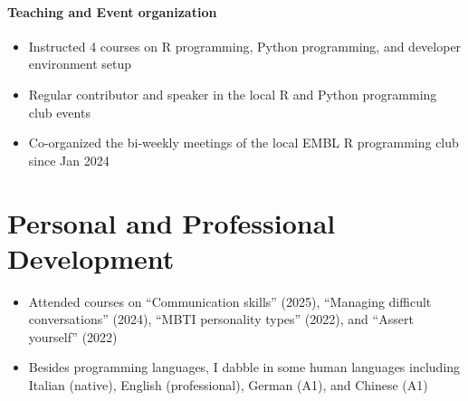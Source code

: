 \documentclass[
	DIV=15,
]{scrartcl}
\begin{document}
\paragraph{Teaching and Event organization}
\begin{itemize}
	\item Instructed 4 courses on R programming, Python programming, and developer environment setup
	\item Regular contributor and speaker in the local R and Python programming club events
	\item Co-organized the bi-weekly meetings of the local EMBL R programming club since Jan 2024
\end{itemize}


\section*{Personal and Professional Development}

\begin{itemize}
	\item Attended courses on \enquote{Communication skills} (2025), \enquote{Managing difficult conversations} (2024), \enquote{MBTI personality types} (2022), and \enquote{Assert yourself} (2022)
	\item Besides programming languages, I dabble in some human languages including Italian (native), English (professional), German (A1), and Chinese (A1)
\end{itemize}
\end{document}
